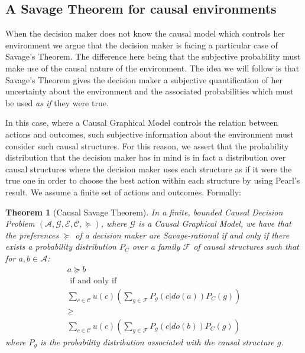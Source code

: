 \documentclass[review]{elsarticle}
\newtheorem{theorem}{Theorem}
\begin{document}
\subsection{A Savage Theorem for causal environments}
\label{section_savage}
When the decision maker does not know the causal model which controls her environment we argue that the decision maker is facing a particular case of Savage's Theorem. The difference here being that the subjective probability must make use of the causal nature of the environment. The idea we will follow is that Savage's Theorem gives the decision maker a subjective quantification of her uncertainty about the environment and the associated probabilities which must be used \textit{as if} they were true. 

In this case, where a Causal Graphical Model controls the relation between actions and outcomes, such subjective information about the environment must consider such causal structures. For this reason, we assert that the probability distribution that the decision maker has in mind is in fact a distribution over causal structures where the decision maker uses each structure as if it were the true one in order to choose the best action within each structure by using Pearl's result. We assume a finite set of actions and outcomes. Formally:

\begin{theorem}[Causal Savage Theorem]
\label{causal_savage}
In a finite, bounded Causal Decision Problem  $(\mathcal{A}, \mathcal{G},\mathcal{E},\mathcal{C},\succeq)$, where $\mathcal{G}$ is a Causal Graphical Model, we have that the preferences $\succeq$ of a decision maker are Savage-rational if and only if there exists a probability distribution $P_C$ over a family $\mathcal{F}$ of causal structures such that for $a,b \in \mathcal{A}$:
\begin{eqnarray*}
&a \succeq b&\\ 
&\textrm{ if and only if }&\\
&\sum_{c \in \mathcal{C}} u(c) \left( \sum_{g \in \mathcal{F}} P_g(c | do(a))P_C(g) \right)&\\
&\geq& \\
&\sum_{c \in \mathcal{C}}  u(c) \left( \sum_{g \in \mathcal{F}} P_g(c | do(b))P_C(g) \right)&
\end{eqnarray*}
where $P_g$ is the probability distribution associated with the causal structure $g$. 
\end{theorem}
\end{document}
